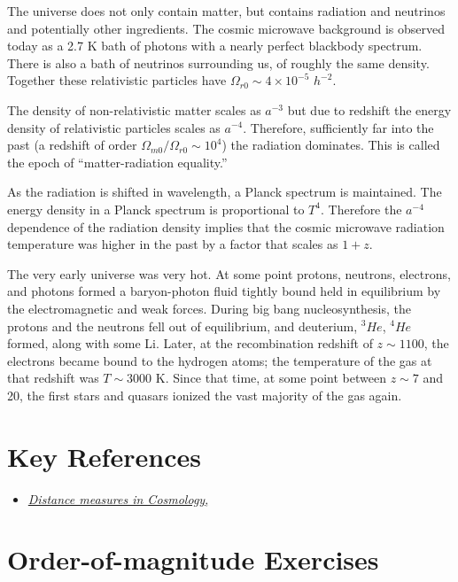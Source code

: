 The universe does not only contain matter, but contains radiation and
neutrinos and potentially other ingredients. The cosmic microwave
background is observed today as a 2.7 K bath of photons with a nearly
perfect blackbody spectrum.  There is also a bath of neutrinos
surrounding us, of roughly the same density. Together these
relativistic particles have $\Omega_{r0} \sim 4\times 10^{-5}$
$h^{-2}$.

The density of non-relativistic matter scales as $a^{-3}$ but due to
redshift the energy density of relativistic particles scales as
$a^{-4}$. Therefore, sufficiently far into the past (a redshift of
order $\Omega_{m0}/\Omega_{r0} \sim 10^4$) the radiation
dominates. This is called the epoch of ``matter-radiation equality.''

As the radiation is shifted in wavelength, a Planck spectrum is
maintained. The energy density in a Planck spectrum is proportional to
$T^4$. Therefore the $a^{-4}$ dependence of the radiation density
implies that the cosmic microwave radiation temperature was higher in
the past by a factor that scales as $1+z$.

The very early universe was very hot. At some point protons, neutrons,
electrons, and photons formed a baryon-photon fluid tightly bound held
in equilibrium by the electromagnetic and weak forces. During big bang
nucleosynthesis, the protons and the neutrons fell out of equilibrium,
and deuterium, ${}^3He$, ${}^4He$ formed, along with some Li. Later,
at the recombination redshift of $z\sim 1100$, the electrons became
bound to the hydrogen atoms; the temperature of the gas at that
redshift was $T\sim 3000$ K. Since that time, at some point between
$z\sim 7$ and 20, the first stars and quasars ionized the vast
majority of the gas again.

\section{Key References}

\begin{itemize}
  \item
    \href{http://adsabs.harvard.edu/abs/1999astro.ph..5116H}{
    {\it Distance measures in Cosmology},
      \citet{hogg99cosm}}
\end{itemize}

\section{Order-of-magnitude Exercises}

